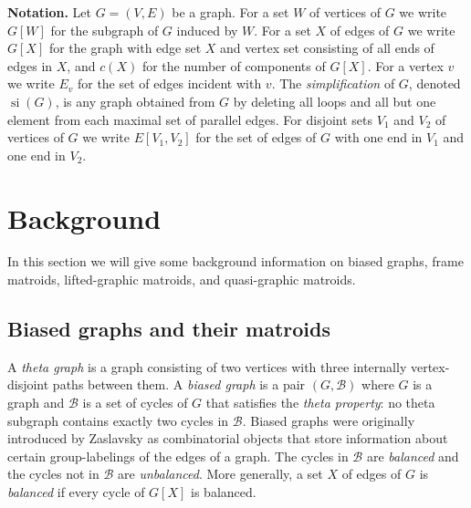 \documentclass[12pt]{article}
\theoremstyle{definition}
\theoremstyle{plain} %
\newcommand{\cB}{\mathcal{B}}
\DeclareMathOperator{\si}{si}
\begin{document}
\bigskip
\noindent 
\textbf{Notation.} 
Let $G = (V, E)$ be a graph.
For a set $W$ of vertices of $G$ we write $G[W]$ for the subgraph of $G$ induced by $W$.
For a set $X$ of edges of $G$ we write $G[X]$ for the graph with edge set $X$ and vertex set consisting of all ends of edges in $X$, and $c(X)$ for the number of components of $G[X]$.
For a vertex $v$ we write $E_v$ for the set of edges incident with $v$.
The \emph{simplification} of $G$, denoted $\si(G)$, is any graph obtained from $G$ by deleting all loops and all but one element from each maximal set of parallel edges.
For disjoint sets $V_1$ and $V_2$ of vertices of $G$ we write $E[V_1, V_2]$ for the set of edges of $G$ with one end in $V_1$ and one end in $V_2$.




\section{Background} \label{sec: background}

In this section we will give some background information on biased graphs, frame matroids, lifted-graphic matroids, and quasi-graphic matroids.


\subsection{Biased graphs and their matroids} \label{sec: biased graphs and their matroids}

A \emph{theta graph} is a graph consisting of two vertices with three internally vertex-disjoint paths between them.
A \emph{biased graph} is a pair $(G, \cB)$ where $G$ is a graph and $\cB$ is a set of cycles of $G$ that satisfies the \emph{theta property}: no theta subgraph contains exactly two cycles in $\cB$.
Biased graphs were originally introduced by Zaslavsky \cite{Zaslavsky1989} as combinatorial objects that store information about certain group-labelings of the edges of a graph.
The cycles in $\cB$ are \emph{balanced} and the cycles not in $\cB$ are \emph{unbalanced}.
More generally, a set $X$ of edges of $G$ is \emph{balanced} if every cycle of $G[X]$ is balanced.
\end{document}
